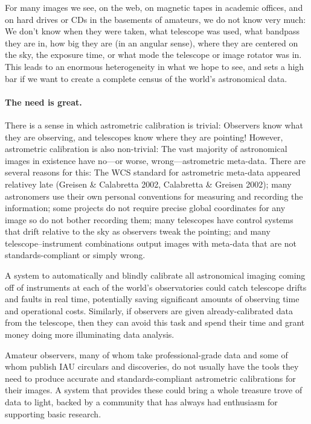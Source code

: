 \documentclass[12pt,preprint]{aastex}
\renewcommand{\%}{\percent}
\begin{document}
For many images we see, on the web, on magnetic tapes in academic
offices, and on hard drives or CDs in the basements of amateurs, we do
not know very much: We don't know when they were taken, what telescope
was used, what bandpass they are in, how big they are (in an angular
sense), where they are centered on the sky, the exposure time, or what
mode the telescope or image rotator was in.  This leads to an enormous
heterogeneity in what we hope to see, and sets a high bar if we want
to create a complete census of the world's astronomical data.

\paragraph{The need is great.}
There is a sense in which astrometric calibration is trivial:
Observers know what they are observing, and telescopes know where they
are pointing!  However, astrometric calibration is also non-trivial:
The vast majority of astronomical images in existence have no---or
worse, wrong---astrometric meta-data.  There are several reasons for
this: The WCS standard for astrometric meta-data appeared relativey
late (Greisen \& Calabretta 2002, Calabretta \& Greisen 2002); many
astronomers use their own personal conventions for measuring and
recording the information; some projects do not require precise global
coordinates for any image so do not bother recording them; many
telescopes have control systems that drift relative to the sky as
observers tweak the pointing; and many telescope--instrument
combinations output images with meta-data that are not
standards-compliant or simply wrong.

A system to automatically and blindly calibrate all astronomical
imaging coming off of instruments at each of the world's observatories
could catch telescope drifts and faults in real time, potentially
saving significant amounts of observing time and operational costs.
Similarly, if observers are given already-calibrated data from the
telescope, then they can avoid this task and spend their time and
grant money doing more illuminating data analysis.

Amateur observers, many of whom take professional-grade data and some
of whom publish IAU circulars and discoveries, do not usually have the
tools they need to produce accurate and standards-compliant
astrometric calibrations for their images.  A system that provides
these could bring a whole treasure trove of data to light, backed by a
community that has always had enthusiasm for supporting basic
research.
\end{document}
